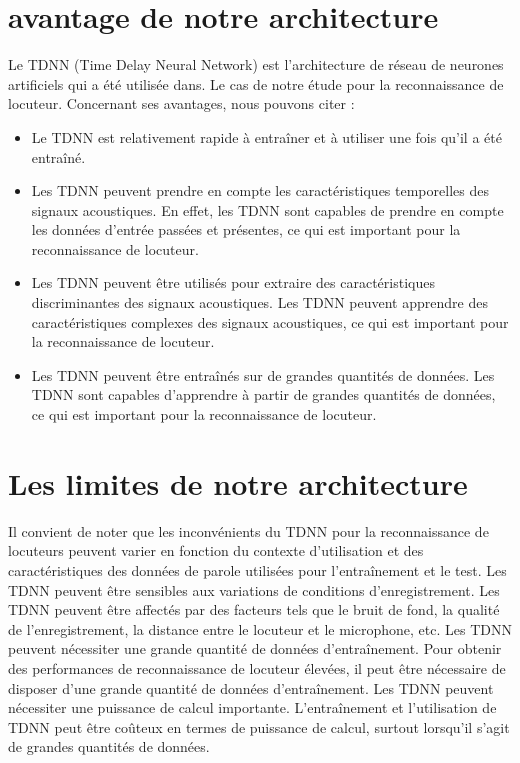 \section{avantage de notre architecture}
Le TDNN (Time Delay Neural Network) est l’architecture de réseau de neurones artificiels qui a été utilisée dans. Le cas de notre étude pour la reconnaissance de locuteur. Concernant ses avantages, nous pouvons citer :
\begin{itemize}
    \item Le TDNN est relativement rapide à entraîner et à utiliser une fois qu'il a été entraîné.
    \item Les TDNN peuvent prendre en compte les caractéristiques temporelles des signaux acoustiques. En effet, les TDNN sont capables de prendre en compte les données d'entrée passées et présentes, ce qui est important pour la reconnaissance de locuteur.
    \item Les TDNN peuvent être utilisés pour extraire des caractéristiques discriminantes des signaux acoustiques. Les TDNN peuvent apprendre des caractéristiques complexes des signaux acoustiques, ce qui est important pour la reconnaissance de locuteur.
    \item Les TDNN peuvent être entraînés sur de grandes quantités de données. Les TDNN sont capables d'apprendre à partir de grandes quantités de données, ce qui est important pour la reconnaissance de locuteur.
\end{itemize}

\section{Les limites de notre architecture}
Il convient de noter que les inconvénients du TDNN pour la reconnaissance de locuteurs peuvent varier en fonction du contexte d'utilisation et des caractéristiques des données de parole utilisées pour l'entraînement et le test.
Les TDNN peuvent être sensibles aux variations de conditions d'enregistrement. Les TDNN peuvent être affectés par des facteurs tels que le bruit de fond, la qualité de l'enregistrement, la distance entre le locuteur et le microphone, etc.
Les TDNN peuvent nécessiter une grande quantité de données d'entraînement. Pour obtenir des performances de reconnaissance de locuteur élevées, il peut être nécessaire de disposer d'une grande quantité de données d'entraînement.
Les TDNN peuvent nécessiter une puissance de calcul importante. L'entraînement et l'utilisation de TDNN peut être coûteux en termes de puissance de calcul, surtout lorsqu'il s'agit de grandes quantités de données.

